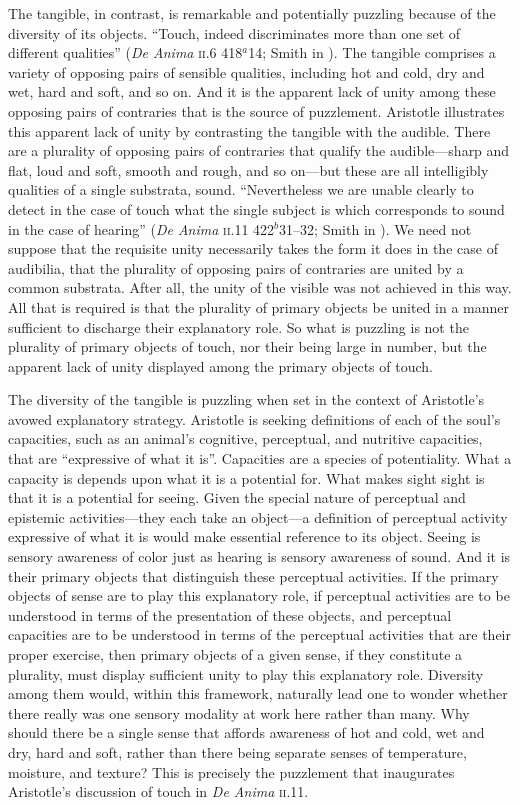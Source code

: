 The tangible, in contrast, is remarkable and potentially puzzling because of the diversity of its objects. ``Touch, indeed discriminates more than one set of different qualities'' (\emph{De Anima} \textsc{ii}.6 418\( ^{a} \)14; Smith in \citealt[32]{Barnes:1984uq}). The tangible comprises a variety of opposing pairs of sensible qualities, including hot and cold, dry and wet, hard and soft, and so on. And it is the apparent lack of unity among these opposing pairs of contraries that is the source of puzzlement. Aristotle illustrates this apparent lack of unity by contrasting the tangible with the audible. There are a plurality of opposing pairs of contraries that qualify the audible---sharp and flat, loud and soft, smooth and rough, and so on---but these are all intelligibly qualities of a single substrata, sound. ``Nevertheless we are unable clearly to detect in the case of touch what the single subject is which corresponds to sound in the case of hearing'' (\emph{De Anima} \textsc{ii}.11 422\( ^{b} \)31--32; Smith in \citealt[40]{Barnes:1984uq}). We need not suppose that the requisite unity necessarily takes the form it does in the case of audibilia, that the plurality of opposing pairs of contraries are united by a common substrata. After all, the unity of the visible was not achieved in this way. All that is required is that the plurality of primary objects be united in a manner sufficient to discharge their explanatory role. So what is puzzling is not the plurality of primary objects of touch, nor their being large in number, but the apparent lack of unity displayed among the primary objects of touch.

The diversity of the tangible is puzzling when set in the context of Aristotle's avowed explanatory strategy. Aristotle is seeking definitions of each of the soul's capacities, such as an animal's cognitive, perceptual, and nutritive capacities, that are ``expressive of what it is''. Capacities are a species of potentiality. What a capacity is depends upon what it is a potential for. What makes sight sight is that it is a potential for seeing. Given the special nature of perceptual and epistemic activities---they each take an object---a definition of perceptual activity expressive of what it is would make essential reference to its object. Seeing is sensory awareness of color just as hearing is sensory awareness of sound. And it is their primary objects that distinguish these perceptual activities. If the primary objects of sense are to play this explanatory role, if perceptual activities are to be understood in terms of the presentation of these objects, and perceptual capacities are to be understood in terms of the perceptual activities that are their proper exercise, then primary objects of a given sense, if they constitute a plurality, must display sufficient unity to play this explanatory role. Diversity among them would, within this framework, naturally lead one to wonder whether there really was one sensory modality at work here rather than many. Why should there be a single sense that affords awareness of hot and cold, wet and dry, hard and soft, rather than there being separate senses of temperature, moisture, and texture? This is precisely the puzzlement that inaugurates Aristotle's discussion of touch in \emph{De Anima} \textsc{ii}.11.

